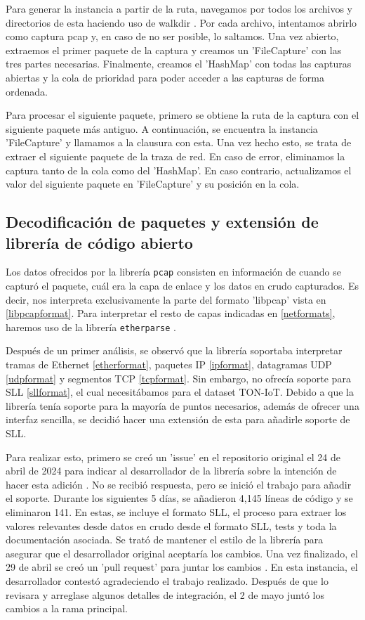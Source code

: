 Para generar la instancia a partir de la ruta, navegamos por todos los archivos y directorios de esta haciendo uso de walkdir \cite{walkdir}. Por cada archivo, intentamos abrirlo como captura pcap y, en caso de no ser posible, lo saltamos. Una vez abierto, extraemos el primer paquete de la captura y creamos un 'FileCapture' con las tres partes necesarias. Finalmente, creamos el 'HashMap' con todas las capturas abiertas y la cola de prioridad para poder acceder a las capturas de forma ordenada.

Para procesar el siguiente paquete, primero se obtiene la ruta de la captura con el siguiente paquete más antiguo. A continuación, se encuentra la instancia 'FileCapture' y llamamos a la clausura con esta. Una vez hecho esto, se trata de extraer el siguiente paquete de la traza de red. En caso de error, eliminamos la captura tanto de la cola como del 'HashMap'. En caso contrario, actualizamos el valor del siguiente paquete en 'FileCapture' y su posición en la cola.

\subsection{Decodificación de paquetes y extensión de librería de código abierto}

Los datos ofrecidos por la librería \texttt{pcap} consisten en información de cuando se capturó el paquete, cuál era la capa de enlace y los datos en crudo capturados. Es decir, nos interpreta exclusivamente la parte del formato 'libpcap' vista en \ref{libpcapformat}. Para interpretar el resto de capas indicadas en \ref{netformats}, haremos uso de la librería \texttt{etherparse} \cite{etherparse}.

Después de un primer análisis, se observó que la librería soportaba interpretar tramas de Ethernet \ref{etherformat}, paquetes IP \ref{ipformat}, datagramas UDP \ref{udpformat} y segmentos TCP \ref{tcpformat}. Sin embargo, no ofrecía soporte para SLL \ref{sllformat}, el cual necesitábamos para el dataset TON-IoT. Debido a que la librería tenía soporte para la mayoría de puntos necesarios, además de ofrecer una interfaz sencilla, se decidió hacer una extensión de esta para añadirle soporte de SLL. 

Para realizar esto, primero se creó un 'issue' en el repositorio original el 24 de abril de 2024 para indicar al desarrollador de la librería sobre la intención de hacer esta adición \cite{slladdsllissue}. No se recibió respuesta, pero se inició el trabajo para añadir el soporte. Durante los siguientes 5 días, se añadieron 4,145 líneas de código y se eliminaron 141. En estas, se incluye el formato SLL, el proceso para extraer los valores relevantes desde datos en crudo desde el formato SLL, tests y toda la documentación asociada. Se trató de mantener el estilo de la librería para asegurar que el desarrollador original aceptaría los cambios. Una vez finalizado, el 29 de abril se creó un 'pull request' para juntar los cambios \cite{slladdsllpr}. En esta instancia, el desarrollador contestó agradeciendo el trabajo realizado. Después de que lo revisara y arreglase algunos detalles de integración, el 2 de mayo juntó los cambios a la rama principal.

